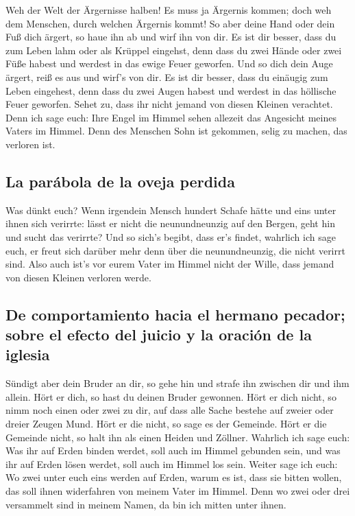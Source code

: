  Weh der Welt der Ärgernisse halben! Es muss ja Ärgernis
kommen; doch weh dem Menschen, durch welchen Ärgernis kommt!
 So aber deine Hand oder dein Fuß dich ärgert, so haue ihn
ab und wirf ihn von dir. Es ist dir besser, dass du zum Leben lahm oder
als Krüppel eingehst, denn dass du zwei Hände oder zwei Füße habest und
werdest in das ewige Feuer geworfen.  Und so dich dein
Auge ärgert, reiß es aus und wirf's von dir. Es ist dir besser, dass du
einäugig zum Leben eingehest, denn dass du zwei Augen habest und werdest
in das höllische Feuer geworfen.  Sehet zu, dass ihr
nicht jemand von diesen Kleinen verachtet. Denn ich sage euch: Ihre
Engel im Himmel sehen allezeit das Angesicht meines Vaters im Himmel.
 Denn des Menschen Sohn ist gekommen, selig zu machen,
das verloren ist.

\hypertarget{la-paruxe1bola-de-la-oveja-perdida}{%
\subsection{La parábola de la oveja
perdida}\label{la-paruxe1bola-de-la-oveja-perdida}}

 Was dünkt euch? Wenn irgendein Mensch hundert Schafe
hätte und eins unter ihnen sich verirrte: lässt er nicht die
neunundneunzig auf den Bergen, geht hin und sucht das verirrte?
 Und so sich's begibt, dass er's findet, wahrlich ich
sage euch, er freut sich darüber mehr denn über die neunundneunzig, die
nicht verirrt sind.  Also auch ist's vor eurem Vater im
Himmel nicht der Wille, dass jemand von diesen Kleinen verloren werde.

\hypertarget{de-comportamiento-hacia-el-hermano-pecador-sobre-el-efecto-del-juicio-y-la-oraciuxf3n-de-la-iglesia}{%
\subsection{De comportamiento hacia el hermano pecador; sobre el efecto
del juicio y la oración de la
iglesia}\label{de-comportamiento-hacia-el-hermano-pecador-sobre-el-efecto-del-juicio-y-la-oraciuxf3n-de-la-iglesia}}

 Sündigt aber dein Bruder an dir, so gehe hin und strafe
ihn zwischen dir und ihm allein. Hört er dich, so hast du deinen Bruder
gewonnen.  Hört er dich nicht, so nimm noch einen oder
zwei zu dir, auf dass alle Sache bestehe auf zweier oder dreier Zeugen
Mund.  Hört er die nicht, so sage es der Gemeinde. Hört
er die Gemeinde nicht, so halt ihn als einen Heiden und Zöllner.
 Wahrlich ich sage euch: Was ihr auf Erden binden werdet,
soll auch im Himmel gebunden sein, und was ihr auf Erden lösen werdet,
soll auch im Himmel los sein.  Weiter sage ich euch: Wo
zwei unter euch eins werden auf Erden, warum es ist, dass sie bitten
wollen, das soll ihnen widerfahren von meinem Vater im Himmel.
 Denn wo zwei oder drei versammelt sind in meinem Namen,
da bin ich mitten unter ihnen.

